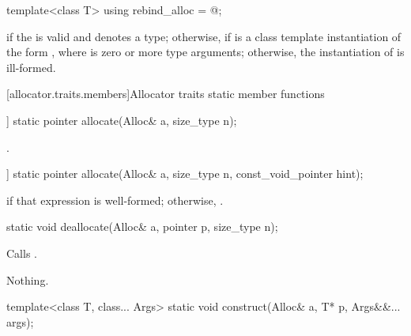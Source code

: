 %
\begin{itemdecl}
template<class T> using rebind_alloc = @\seebelow@;
\end{itemdecl}

\begin{itemdescr}
\pnum
\templalias {} if
the   is valid and denotes a
type; otherwise,
 if  is a class template instantiation
of the form , where  is zero or more type arguments;
otherwise, the instantiation of  is ill-formed.
\end{itemdescr}

[allocator.traits.members]{Allocator traits static member functions}

%
\begin{itemdecl}
[[nodiscard]] static pointer allocate(Alloc& a, size_type n);
\end{itemdecl}

\begin{itemdescr}
\pnum
\returns {}.
\end{itemdescr}

%
\begin{itemdecl}
[[nodiscard]] static pointer allocate(Alloc& a, size_type n, const_void_pointer hint);
\end{itemdecl}

\begin{itemdescr}
\pnum
\returns {} if that expression is well-formed; otherwise, .
\end{itemdescr}

%
\begin{itemdecl}
static void deallocate(Alloc& a, pointer p, size_type n);
\end{itemdecl}

\begin{itemdescr}
\pnum
\effects Calls .

\pnum
\throws Nothing.
\end{itemdescr}

%
\begin{itemdecl}
template<class T, class... Args>
  static void construct(Alloc& a, T* p, Args&&... args);
\end{itemdecl}

